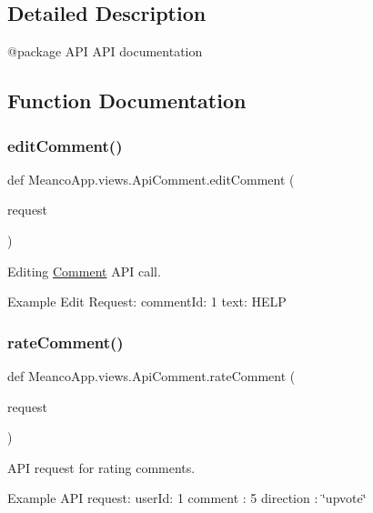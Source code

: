 \subsection{Detailed Description}
\begin{DoxyVerb}@package API
API documentation\end{DoxyVerb}
 

\subsection{Function Documentation}
\hypertarget{namespace_meanco_app_1_1views_1_1_api_comment_a611c3862a4a6724455998ef774e1f615}{}\label{namespace_meanco_app_1_1views_1_1_api_comment_a611c3862a4a6724455998ef774e1f615} 
\subsubsection{\texorpdfstring{edit\+Comment()}{editComment()}}
{\footnotesize\ttfamily def Meanco\+App.\+views.\+Api\+Comment.\+edit\+Comment (\begin{DoxyParamCaption}\item[{}]{request }\end{DoxyParamCaption})}



Editing \hyperlink{namespace_meanco_app_1_1views_1_1_comment}{Comment} A\+PI call. 

Example Edit Request\+: comment\+Id\+: 1 text\+: H\+E\+LP \hypertarget{namespace_meanco_app_1_1views_1_1_api_comment_a3126e77b21099a4dd4dea0c7d5370b50}{}\label{namespace_meanco_app_1_1views_1_1_api_comment_a3126e77b21099a4dd4dea0c7d5370b50} 
\subsubsection{\texorpdfstring{rate\+Comment()}{rateComment()}}
{\footnotesize\ttfamily def Meanco\+App.\+views.\+Api\+Comment.\+rate\+Comment (\begin{DoxyParamCaption}\item[{}]{request }\end{DoxyParamCaption})}



A\+PI request for rating comments. 

Example A\+PI request\+: user\+Id\+: 1 comment \+: 5 direction \+: \char`\"{}upvote\char`\"{} 